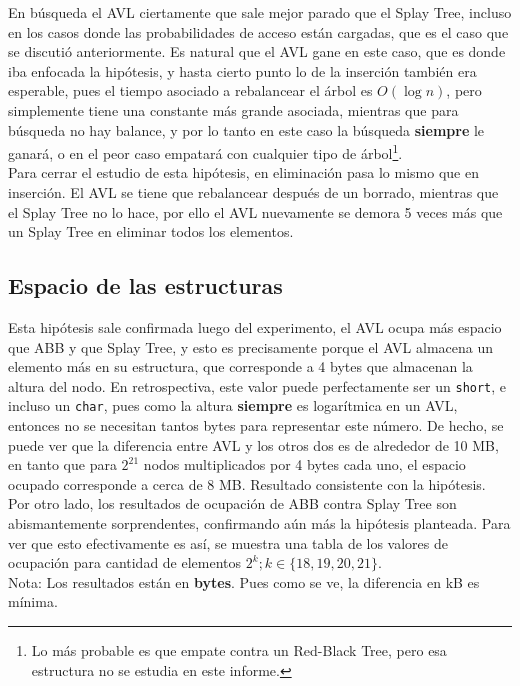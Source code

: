 \documentclass[12pt,letterpaper]{report}
\begin{document}
En búsqueda el AVL ciertamente que sale mejor parado que el Splay Tree, incluso en los casos donde las probabilidades de acceso están cargadas, que es el caso que se discutió anteriormente. Es natural que el AVL gane en este caso, que es donde iba enfocada la hipótesis, y hasta cierto punto lo de la inserción también era esperable, pues el tiempo asociado a rebalancear el árbol es $O(\log n)$, pero simplemente tiene una constante más grande asociada, mientras que para búsqueda no hay balance, y por lo tanto en este caso la búsqueda \textbf{siempre} le ganará, o en el peor caso empatará con cualquier tipo de árbol\footnote{Lo más probable es que empate contra un Red-Black Tree, pero esa estructura no se estudia en este informe.}.\\

Para cerrar el estudio de esta hipótesis, en eliminación pasa lo mismo que en inserción. El AVL se tiene que rebalancear después de un borrado, mientras que el Splay Tree no lo hace, por ello el AVL nuevamente se demora 5 veces más que un Splay Tree en eliminar todos los elementos.

\subsection{Espacio de las estructuras}
\label{subsec:analisis_ocupacion}
Esta hipótesis sale confirmada luego del experimento, el AVL ocupa más espacio que ABB y que Splay Tree, y esto es precisamente porque el AVL almacena un elemento más en su estructura, que corresponde a 4 bytes que almacenan la altura del nodo. En retrospectiva, este valor puede perfectamente ser un \texttt{short}, e incluso un \texttt{char}, pues como la altura \textbf{siempre} es logarítmica en un AVL, entonces no se necesitan tantos bytes para representar este número. De hecho, se puede ver que la diferencia entre AVL y los otros dos es de alrededor de 10 MB, en tanto que para $2^{21}$ nodos multiplicados por 4 bytes cada uno, el espacio ocupado corresponde a cerca de 8 MB. Resultado consistente con la hipótesis.\\

Por otro lado, los resultados de ocupación de ABB contra Splay Tree son abismantemente sorprendentes, confirmando aún más la hipótesis planteada. Para ver que esto efectivamente es así, se muestra una tabla de los valores de ocupación para cantidad de elementos $2^k; k\in \{18, 19, 20, 21\}$.\\

Nota: Los resultados están en \textbf{bytes}. Pues como se ve, la diferencia en kB es mínima.
\end{document}
